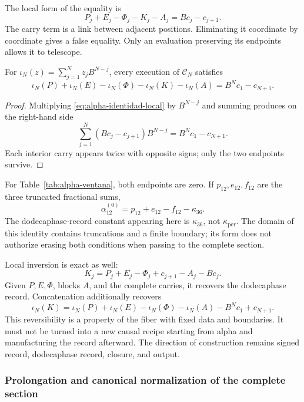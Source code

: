 The local form of the equality is
\begin{equation}
 P_j+E_j-\Phi_j-K_j-A_j=Bc_j-c_{j+1}.
 \label{eq:alpha-identidad-local}
\end{equation}
The carry term is a link between adjacent positions. Eliminating it
coordinate by coordinate gives a false equality. Only an
evaluation preserving its endpoints allows it to telescope.

\begin{proposition}
\label{prop:alpha-telescopia}
For \(\iota_N(z)=\sum_{j=1}^{N}z_jB^{N-j}\), every execution of
\(\mathcal C_N\) satisfies
\begin{equation}
 \iota_N(P)+\iota_N(E)-\iota_N(\Phi)-\iota_N(K)-\iota_N(A)
 =B^Nc_1-c_{N+1}.
 \label{eq:alpha-telescopia}
\end{equation}
\end{proposition}

\begin{proof}
Multiplying \eqref{eq:alpha-identidad-local} by \(B^{N-j}\) and summing
produces on the right-hand side
\[
 \sum_{j=1}^{N}(Bc_j-c_{j+1})B^{N-j}=B^Nc_1-c_{N+1}.
\]
Each interior carry appears twice with opposite signs; only
the two endpoints survive.
\end{proof}

For Table~\ref{tab:alpha-ventana}, both endpoints are zero. If
\(p_{12},e_{12},f_{12}\) are the three truncated fractional sums,
\[
 \alpha_{12}^{(0)}=p_{12}+e_{12}-f_{12}-\kappa_{36}.
\]
The dodecaphase-record constant appearing here is \(\kappa_{36}\), not
\(\kappa_{\mathrm{per}}\). The domain of this identity contains
truncations and a finite boundary; its form does not authorize erasing both
conditions when passing to the complete section.

Local inversion is exact as well:
\[
 K_j=P_j+E_j-\Phi_j+c_{j+1}-A_j-Bc_j.
\]
Given \(P,E,\Phi\), blocks \(A\), and the complete carries,
it recovers the dodecaphase record. Concatenation additionally recovers
\[
 \iota_N(K)=\iota_N(P)+\iota_N(E)-\iota_N(\Phi)-\iota_N(A)
             -B^Nc_1+c_{N+1}.
\]
This reversibility is a property of the fiber with fixed data and
boundaries. It must not be turned into a new causal recipe starting from
alpha and manufacturing the record afterward. The direction of construction remains
signed record, dodecaphase record, closure, and output.

\subsubsection{Prolongation and canonical normalization of the complete section}
\label{subsec:alpha-completa}

